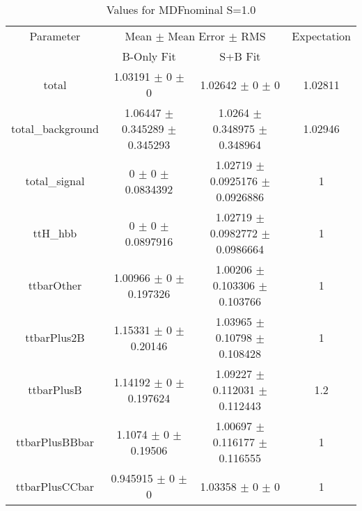 \begin{table}
\centering
\caption{Values for MDFnominal S=1.0}
\begin{tabular}{cccc}
\toprule
Parameter & \multicolumn{2}{c}{Mean $\pm$ Mean Error $\pm$ RMS} & Expectation\\
 & B-Only Fit & S+B Fit & \\
\midrule
total & \num{1.03191} $\pm$ \num{0} $\pm$ \num{0} & \num{1.02642} $\pm$ \num{0} $\pm$ \num{0} & \num{1.02811}\\
total\_background & \num{1.06447} $\pm$ \num{0.345289} $\pm$ \num{0.345293} & \num{1.0264} $\pm$ \num{0.348975} $\pm$ \num{0.348964} & \num{1.02946}\\
total\_signal & \num{0} $\pm$ \num{0} $\pm$ \num{0.0834392} & \num{1.02719} $\pm$ \num{0.0925176} $\pm$ \num{0.0926886} & \num{1}\\
ttH\_hbb & \num{0} $\pm$ \num{0} $\pm$ \num{0.0897916} & \num{1.02719} $\pm$ \num{0.0982772} $\pm$ \num{0.0986664} & \num{1}\\
ttbarOther & \num{1.00966} $\pm$ \num{0} $\pm$ \num{0.197326} & \num{1.00206} $\pm$ \num{0.103306} $\pm$ \num{0.103766} & \num{1}\\
ttbarPlus2B & \num{1.15331} $\pm$ \num{0} $\pm$ \num{0.20146} & \num{1.03965} $\pm$ \num{0.10798} $\pm$ \num{0.108428} & \num{1}\\
ttbarPlusB & \num{1.14192} $\pm$ \num{0} $\pm$ \num{0.197624} & \num{1.09227} $\pm$ \num{0.112031} $\pm$ \num{0.112443} & \num{1.2}\\
ttbarPlusBBbar & \num{1.1074} $\pm$ \num{0} $\pm$ \num{0.19506} & \num{1.00697} $\pm$ \num{0.116177} $\pm$ \num{0.116555} & \num{1}\\
ttbarPlusCCbar & \num{0.945915} $\pm$ \num{0} $\pm$ \num{0} & \num{1.03358} $\pm$ \num{0} $\pm$ \num{0} & \num{1}\\
\bottomrule
\end{tabular}
\end{table}